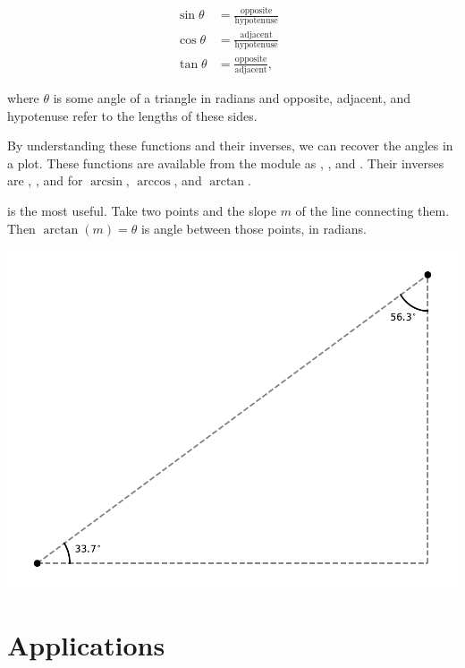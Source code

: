 \begin{align*}
    \sin \theta & = \frac{\text{opposite}}{\text{hypotenuse}} & \\ 
    \cos \theta & =  \frac{\text{adjacent}}{\text{hypotenuse}} &\\ 
    \tan \theta & = \frac{\text{opposite}}{\text{adjacent}}, &
\end{align*}

\noindent where $\theta$ is some angle of a triangle in radians and opposite, adjacent, and hypotenuse refer to the lengths of these sides. 

By understanding these functions and their inverses, we can recover the angles in a plot. These functions are available from the  module as , , and . Their inverses are , , and  for $\arcsin$, $\arccos$, and $\arctan$. 

 is the most useful. Take two points and the slope $m$ of the line connecting them. Then $\arctan(m) = \theta$ is angle between those points, in radians. 


\begin{center}
    \includegraphics[width = .7\textwidth]{figures/mathplots/r-triangle.pdf}
\end{center}




\chapter{Applications}\label{chapter:mathapp}

